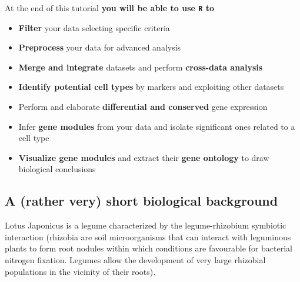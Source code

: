 \documentclass[
  letterpaper,
  DIV=11,
  numbers=noendperiod]{scrartcl}
\providecommand{\tightlist}{%
  \setlength{\itemsep}{0pt}\setlength{\parskip}{0pt}}\usepackage{longtable,booktabs,array}
\begin{document}
\begin{tcolorbox}[enhanced jigsaw, arc=.35mm, toprule=.15mm, breakable, bottomrule=.15mm, title={Learning outcomes}, opacityback=0, colframe=quarto-callout-note-color-frame, opacitybacktitle=0.6, leftrule=.75mm, titlerule=0mm, left=2mm, bottomtitle=1mm, toptitle=1mm, colback=white, rightrule=.15mm, colbacktitle=quarto-callout-note-color!10!white, coltitle=black]

At the end of this tutorial \textbf{you will be able to use \texttt{R}
to}

\begin{itemize}
\tightlist
\item
  \textbf{Filter} your data selecting specific criteria
\item
  \textbf{Preprocess} your data for advanced analysis
\item
  \textbf{Merge and integrate} datasets and perform \textbf{cross-data
  analysis}
\item
  \textbf{Identify potential cell types} by markers and exploiting other
  datasets
\item
  Perform and elaborate \textbf{differential and conserved} gene
  expression
\item
  Infer \textbf{gene modules} from your data and isolate significant
  ones related to a cell type
\item
  \textbf{Visualize gene modules} and extract their \textbf{gene
  ontology} to draw biological conclusions
\end{itemize}

\end{tcolorbox}

\hypertarget{a-rather-very-short-biological-background}{%
\subsection{A (rather very) short biological
background}\label{a-rather-very-short-biological-background}}

Lotus Japonicus is a legume characterized by the legume-rhizobium
symbiotic interaction (rhizobia are soil microorganisms that can
interact with leguminous plants to form root nodules within which
conditions are favourable for bacterial nitrogen fixation. Legumes allow
the development of very large rhizobial populations in the vicinity of
their roots).
\end{document}
